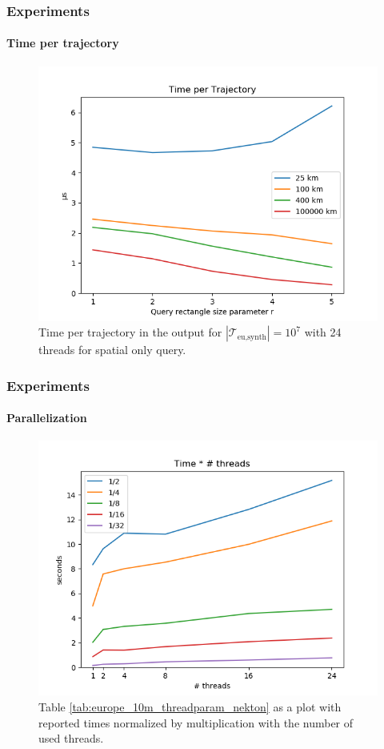 \documentclass{beamer}
\newcommand{\traj}[2]{\mathcal{T}_{\text{#1},\text{#2}}}
\begin{document}
\begin{frame}
	\frametitle{Experiments}
	\framesubtitle{Time per trajectory}
	\begin{figure}
		\centering
		\includegraphics[width=\linewidth]{graphics/time_per_trajectory.png}
		\caption{Time per trajectory in the output for $|\traj{eu}{synth}| = 10^7$ with 24 threads for spatial only query.
		}
	\end{figure}
\end{frame}

\begin{frame}
	\frametitle{Experiments}
	\framesubtitle{Parallelization}
	\begin{figure}
		\centering
		\includegraphics[width=\linewidth]{graphics/normalized_thread_times.png}
		\caption{Table \ref{tab:europe_10m_threadparam_nekton} as a plot with reported times normalized by multiplication with the number of used threads.}
		\label{fig:normalized_thread_times}
	\end{figure}
\end{frame}
\end{document}
